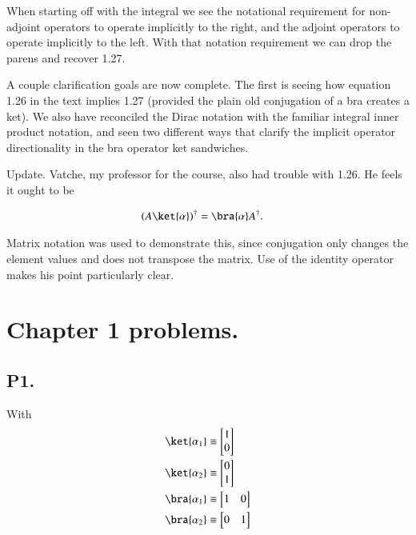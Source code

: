 When starting off with the integral we see the notational requirement for non-adjoint operators to operate implicitly to the right, and the adjoint operators to operate implicitly to the left.  With that notation requirement we can drop the parens and recover 1.27.

A couple clarification goals are now complete.  The first is seeing how equation 1.26 in the text implies 1.27 (provided the plain old conjugation of a bra creates a ket).  We also have reconciled the Dirac notation with the familiar integral inner product notation, and seen two different ways that clarify the implicit operator directionality in the bra operator ket sandwiches.

Update.  Vatche, my professor for the course, also had trouble with 1.26.  He feels it ought to be

\begin{align*}
\left( A \ket{\alpha} \right)^\dagger &= \bra{\alpha} A^\dagger.
\end{align*}

Matrix notation was used to demonstrate this, since conjugation only changes the element values and does not transpose the matrix.  Use of the identity operator makes his point particularly clear.

\section{Chapter 1 problems.}

\subsection{P1.}

With
\begin{align*}
\ket{\alpha_1} &\equiv 
\begin{bmatrix}
1 \\
0
\end{bmatrix} \\
\ket{\alpha_2} &\equiv 
\begin{bmatrix}
0 \\
1
\end{bmatrix} \\
\bra{\alpha_1} &\equiv 
\begin{bmatrix}
1 & 0
\end{bmatrix} \\
\bra{\alpha_2} &\equiv 
\begin{bmatrix}
0 & 1
\end{bmatrix}
\end{align*}

